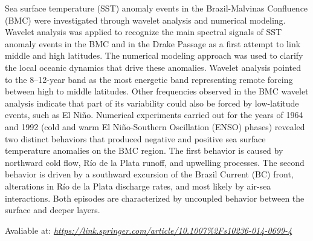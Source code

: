 \noindent Sea surface temperature (SST) anomaly events in the Brazil-Malvinas Confluence (BMC) were investigated through wavelet analysis and numerical modeling. Wavelet analysis was applied to recognize 
          the main spectral signals of SST anomaly events in the BMC and in the Drake Passage as a first attempt to link middle and high latitudes. The numerical modeling approach was used to clarify the 
          local oceanic dynamics that drive these anomalies. Wavelet analysis pointed to the 8–12-year band as the most energetic band representing remote forcing between high to middle latitudes. Other 
          frequencies observed in the BMC wavelet analysis indicate that part of its variability could also be forced by low-latitude events, such as El Niño. Numerical experiments carried out for the 
          years of 1964 and 1992 (cold and warm El Niño-Southern Oscillation (ENSO) phases) revealed two distinct behaviors that produced negative and positive sea surface temperature anomalies on the 
          BMC region. The first behavior is caused by northward cold flow, Río de la Plata runoff, and upwelling processes. The second behavior is driven by a southward excursion of the Brazil Current 
          (BC) front, alterations in Río de la Plata discharge rates, and most likely by air-sea interactions. Both episodes are characterized by uncoupled behavior between the surface and deeper layers.
\bigskip

\noindent {}
\bigskip

\noindent Avaliable at: \textcolor{bleu_cite}{\href{https://link.springer.com/article/10.1007\%2Fs10236-014-0699-4}{\textit{https://link.springer.com/article/10.1007\%2Fs10236-014-0699-4}}}

\bigskip

